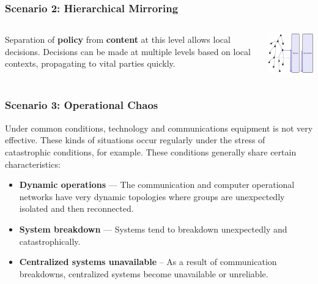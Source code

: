 \documentclass[t,handout, 10pt]{beamer}
\begin{document}
\begin{frame}
\frametitle{Scenario 2: Hierarchical Mirroring}
\begin{columns}[T]
\begin{column}{5cm}
Separation of \textbf{policy} from \textbf{content} at this level allows local decisions.
\newline
\newline
Decisions can be made at multiple levels based on local contexts, propagating to vital parties quickly.
\end{column}
\begin{column}{5cm}
\includegraphics[width=5cm]{hierarchy-3}
\end{column}
\end{columns}
\end{frame}

%
%

\begin{frame}
\frametitle{Scenario 3: Operational Chaos}
Under common conditions, technology and communications equipment is not very effective.  These kinds of situations occur regularly under the stress of catastrophic conditions, for example.
\newline
\newline
\pause
These conditions generally share certain characteristics:
\begin{itemize}
\item \textbf{Dynamic operations} --- The communication and computer operational networks have very dynamic topologies where groups are unexpectedly isolated and then reconnected.
\pause
\item \textbf{System breakdown} --- Systems tend to breakdown unexpectedly and catastrophically.
\pause
\item \textbf{Centralized systems unavailable} -- As a result of communication breakdowns, centralized systems become unavailable or unreliable.
\end{itemize}
\end{frame}
\end{document}
